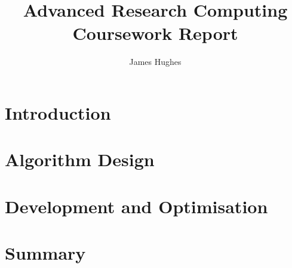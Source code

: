 \documentclass[12pt]{article}
\title{Advanced Research Computing Coursework Report}
\author{James Hughes}
\begin{document}
\maketitle
\newpage

\section*{Introduction}
\section*{Algorithm Design}
\section*{Development and Optimisation}
\section*{Summary}
\end{document}
